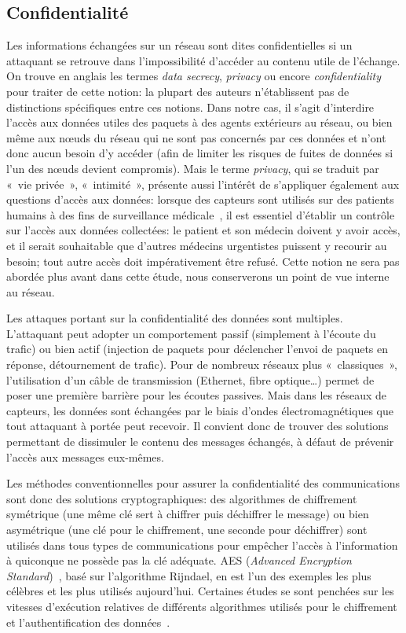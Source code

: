 \subsection{Confidentialité}

Les informations échangées sur un réseau sont dites confidentielles si un attaquant se retrouve dans l'impossibilité d'accéder au contenu utile de l'échange.
On trouve en anglais les termes \textit{data secrecy}, \textit{privacy} ou encore \textit{confidentiality} pour traiter de cette notion: la plupart des auteurs n'établissent pas de distinctions spécifiques entre ces notions.
Dans notre cas, il s'agit d'interdire l'accès aux données utiles des paquets à des agents extérieurs au réseau, ou bien même aux nœuds du réseau qui ne sont pas concernés par ces données et n'ont donc aucun besoin d'y accéder (afin de limiter les risques de fuites de données si l'un des nœuds devient compromis).
Mais le terme \textit{privacy}, qui se traduit par « vie privée », « intimité », présente aussi l'intérêt de s'appliquer également aux questions d'accès aux données: lorsque des capteurs sont utilisés sur des patients humains à des fins de surveillance médicale~\cite{SZFDXC14}, il est essentiel d'établir un contrôle sur l'accès aux données collectées: le patient et son médecin doivent y avoir accès, et il serait souhaitable que d'autres médecins urgentistes puissent y recourir au besoin; tout autre accès doit impérativement être refusé.
Cette notion ne sera pas abordée plus avant dans cette étude, nous conserverons un point de vue interne au réseau.

Les attaques portant sur la confidentialité des données sont multiples.
L'attaquant peut adopter un comportement passif (simplement à l'écoute du trafic) ou bien actif (injection de paquets pour déclencher l'envoi de paquets en réponse, détournement de trafic).
Pour de nombreux réseaux plus « classiques », l'utilisation d'un câble de transmission (Ethernet, fibre optique\dots) permet de poser une première barrière pour les écoutes passives.
Mais dans les réseaux de capteurs, les données sont échangées par le biais d'ondes électromagnétiques que tout attaquant à portée peut recevoir.
Il convient donc de trouver des solutions permettant de dissimuler le contenu des messages échangés, à défaut de prévenir l'accès aux messages eux-mêmes.

Les méthodes conventionnelles pour assurer la confidentialité des communications sont donc des solutions cryptographiques: des algorithmes de chiffrement symétrique (une même clé sert à chiffrer puis déchiffrer le message) ou bien asymétrique (une clé pour le chiffrement, une seconde pour déchiffrer) sont utilisés dans tous types de communications pour empêcher l'accès à l'information à quiconque ne possède pas la clé adéquate.
AES (\textit{Advanced Encryption Standard})~\cite{aes}, basé sur l'algorithme Rijndael, en est l'un des exemples les plus célèbres et les plus utilisés aujourd'hui.
Certaines études se sont penchées sur les vitesses d'exécution relatives de différents algorithmes utilisés pour le chiffrement et l'authentification des données~\cite{SOBMCN11}.

